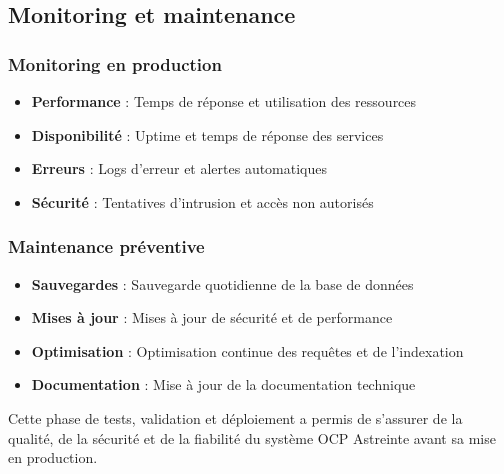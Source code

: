 \subsection{Monitoring et maintenance}
\subsubsection{Monitoring en production}
\begin{itemize}
    \item \textbf{Performance} : Temps de réponse et utilisation des ressources
    \item \textbf{Disponibilité} : Uptime et temps de réponse des services
    \item \textbf{Erreurs} : Logs d'erreur et alertes automatiques
    \item \textbf{Sécurité} : Tentatives d'intrusion et accès non autorisés
\end{itemize}

\subsubsection{Maintenance préventive}
\begin{itemize}
    \item \textbf{Sauvegardes} : Sauvegarde quotidienne de la base de données
    \item \textbf{Mises à jour} : Mises à jour de sécurité et de performance
    \item \textbf{Optimisation} : Optimisation continue des requêtes et de l'indexation
    \item \textbf{Documentation} : Mise à jour de la documentation technique
\end{itemize}

Cette phase de tests, validation et déploiement a permis de s'assurer de la qualité, de la sécurité et de la fiabilité du système OCP Astreinte avant sa mise en production.

